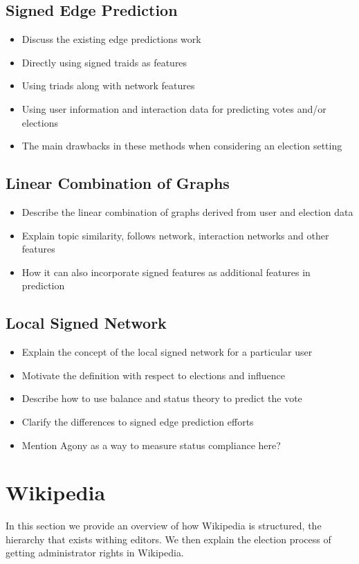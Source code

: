 \section{Signed Edge Prediction}
\begin{itemize}
    \item Discuss the existing edge predictions work
    \item Directly using signed traids as features
    \item Using triads along with network features
    \item Using user information and interaction data for predicting votes and/or elections
    \item The main drawbacks in these methods when considering an election setting
\end{itemize}
\section{Linear Combination of Graphs}
\begin{itemize}
    \item Describe the linear combination of graphs derived from user and election data
    \item Explain topic similarity, follows network, interaction networks and other features
    \item How it can also incorporate signed features as additional features in prediction
\end{itemize}
\section{Local Signed Network}
\begin{itemize}
    \item Explain the concept of the local signed network for a particular user
    \item Motivate the definition with respect to elections and influence
    \item Describe how to use balance and status theory to predict the vote
    \item Clarify the differences to signed edge prediction efforts
    \item Mention Agony as a way to measure status compliance here?
\end{itemize}

\chapter{Wikipedia}
In this section we provide an overview of how Wikipedia is structured, the hierarchy that exists withing editors. We then explain the election process of getting administrator rights in Wikipedia.

